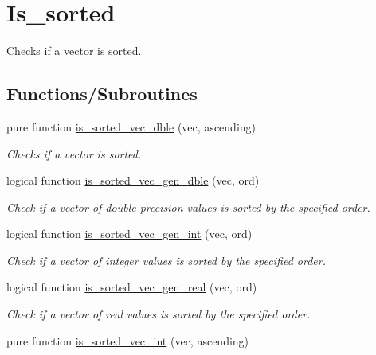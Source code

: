 \hypertarget{group__is__sorted}{\section{Is\-\_\-sorted}
\label{group__is__sorted}
}


Checks if a vector is sorted.  


\subsection*{Functions/\-Subroutines}
\begin{DoxyCompactItemize}
\item 
pure function \hyperlink{group__is__sorted_ga0e08c0597f2e8e32dee62cf3a9faab6a_ga0e08c0597f2e8e32dee62cf3a9faab6a}{is\-\_\-sorted\-\_\-vec\-\_\-dble} (vec, ascending)
\begin{DoxyCompactList}\small\item\em Checks if a vector is sorted. \end{DoxyCompactList}\item 
logical function \hyperlink{group__is__sorted_ga24448988ac1dd8b921b70014162f4cb2_ga24448988ac1dd8b921b70014162f4cb2}{is\-\_\-sorted\-\_\-vec\-\_\-gen\-\_\-dble} (vec, ord)
\begin{DoxyCompactList}\small\item\em Check if a vector of double precision values is sorted by the specified order. \end{DoxyCompactList}\item 
logical function \hyperlink{group__is__sorted_ga12a818ddd2788abf54f8d94e6ea941f6_ga12a818ddd2788abf54f8d94e6ea941f6}{is\-\_\-sorted\-\_\-vec\-\_\-gen\-\_\-int} (vec, ord)
\begin{DoxyCompactList}\small\item\em Check if a vector of integer values is sorted by the specified order. \end{DoxyCompactList}\item 
logical function \hyperlink{group__is__sorted_ga31064500711fc6445efca5f98021a6ed_ga31064500711fc6445efca5f98021a6ed}{is\-\_\-sorted\-\_\-vec\-\_\-gen\-\_\-real} (vec, ord)
\begin{DoxyCompactList}\small\item\em Check if a vector of real values is sorted by the specified order. \end{DoxyCompactList}\item 
pure function \hyperlink{group__is__sorted_ga80744f3ac7ffc97aae6b4802bd5279a4_ga80744f3ac7ffc97aae6b4802bd5279a4}{is\-\_\-sorted\-\_\-vec\-\_\-int} (vec, ascending)

\end{DoxyCompactItemize}

